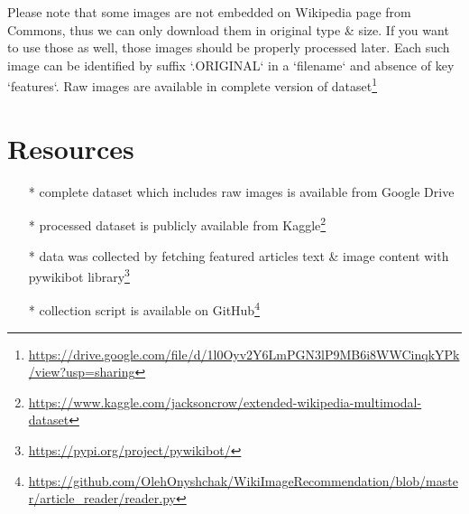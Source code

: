 Please note that some images are not embedded on Wikipedia page from Commons, thus we can only download them in original type \& size. If you want to use those as well, those images should be properly processed later. Each such image can be identified by suffix `.ORIGINAL` in a `filename` and absence of key `features`. Raw images are available in complete version of dataset\footnote{\url{https://drive.google.com/file/d/1l0Oyv2Y6LmPGN3lP9MB6i8WWCinqkYPk/view?usp=sharing}}

\section{Resources}
\begin{itemize}
    \item[*] complete dataset which includes raw images is available from Google Drive \footnotemark[\value{footnote}]
    \item[*] processed dataset is publicly available from Kaggle\footnote{\url{https://www.kaggle.com/jacksoncrow/extended-wikipedia-multimodal-dataset}}
    \item[*] data was collected by fetching featured articles text \& image content with pywikibot library\footnote{\url{https://pypi.org/project/pywikibot/}}
    \item[*] collection script is available on GitHub\footnote{\url{https://github.com/OlehOnyshchak/WikiImageRecommendation/blob/master/article_reader/reader.py}}
\end{itemize}

\endinput